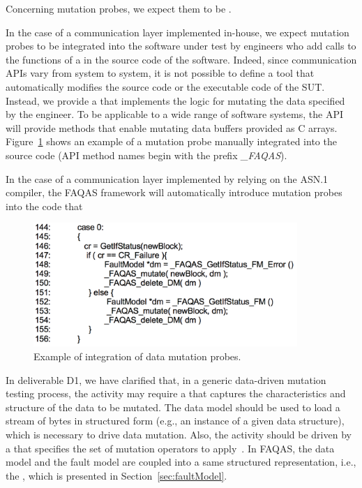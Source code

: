 Concerning mutation probes, we expect them to be .

In the case of a communication layer implemented in-house, we expect mutation probes to be integrated into the software under test by engineers who  add calls to the functions of a  in the source code of the software. Indeed, since communication APIs vary from system to system, it is not possible to define a tool that automatically modifies the source code or the executable code of the SUT.  Instead, we provide a  that implements the logic for mutating the data specified by the engineer.
To be applicable to a wide range of software systems, the API will provide methods that enable mutating data buffers provided as C arrays.
Figure~\ref{fig:data:mutationProbes} shows an example of a mutation probe manually integrated into the source code (API method names begin with the prefix \emph{\_FAQAS}).

In the case of a communication layer implemented by relying on the ASN.1 compiler, the FAQAS framework will automatically introduce mutation probes into the code that 




\begin{figure}
	\centering
		\includegraphics[width=10cm]{images/dataMutationProbes}
		\caption{Example of integration of data mutation probes.}
		\label{fig:data:mutationProbes}
	\end{figure}


	
In deliverable D1, we have clarified that, in a generic data-driven mutation testing process, the activity  may require a  that captures the characteristics and structure of the data to be mutated. 
The data model should be used to load a stream of bytes in structured form (e.g., an instance of a given data structure), which is necessary to drive data mutation. 
Also, the activity  should be driven by a  that specifies the set of mutation operators to apply~\cite{di2015generating}. 
In FAQAS, the data model and the fault model are coupled into a same structured representation, i.e., the , which is presented in Section~\ref{sec:faultModel}.


